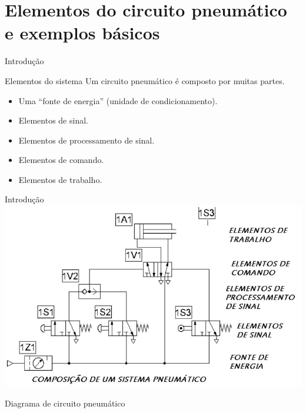 \section{Elementos do circuito pneumático e exemplos básicos}


\begin{frame}{Introdução}
\begin{block}{Elementos do sistema}
	Um circuito pneumático é composto por muitas partes.
	\begin{itemize}
		\item Uma ``fonte de energia'' (unidade de condicionamento).
		\item Elementos de sinal.
		\item Elementos de processamento de sinal.
		\item Elementos de comando.
		\item Elementos de trabalho.
	\end{itemize}
\end{block}
\end{frame}


\begin{frame}{Introdução}
	\centering
	\includegraphics[width=0.9\linewidth]{Figuras/Ch14/fig01}
	
	Diagrama de circuito pneumático
\end{frame}



